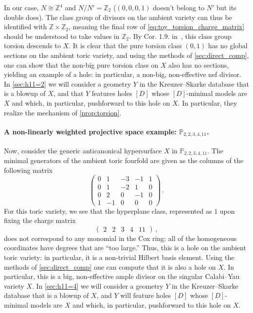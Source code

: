 \documentclass[11pt,dvipsnames]{article}
\theoremstyle{definition}
\begin{document}
In our case, $N \cong \mathbb{Z}^4$ and $N / N' = \mathbb{Z}_2$ ($(0,0,0,1)$ doesn't belong to $N'$ but its double does). The class group of divisors on the ambient variety can thus be identified with $\mathbb{Z} \times \mathbb{Z}_2$, meaning the final row of \cref{eq:toy_torsion_charge_matrix} should be understood to take values in $\mathbb{Z}_2$. By Cor. 1.9. in~\cite{Batyrev:2005jc}, this class group torsion descends to $X$. It is clear that the pure torsion class $(0,1)$ has no global sections on the ambient toric variety, and using the methods of \cref{sec:direct_comp}, one can show that the non-big pure torsion class on $X$ also has no sections, yielding an example of a hole: in particular, a non-big, non-effective nef divisor. In \cref{sec:h11=2} we will consider a geometry $Y$ in the Kreuzer--Skarke database that is a blowup of $X$, and that $Y$ features holes $[D]$ whose $[D]$-minimal models are $X$ and which, in particular, pushforward to this hole on $X$. In particular, they realize the mechanism of \cref{prop:torsion}.

\paragraph{A non-linearly weighted projective space example: $\mathbb{P}_{2,2,3,4,11}$.} Now, consider the generic anticanonical hypersurface $X$ in $\mathbb{P}_{2,2,3,4,11}$. The minimal generators of the ambient toric fourfold are given as the columns of the following matrix
\begin{equation}
    \begin{pmatrix}
        0 & 1 & -3 & -1 & 1 \\
        0 & 1 & -2 & 1 & 0\\
        0 & 2 & 0 & -1 & 0 \\
        1 & -1 & 0 & 0 & 0
    \end{pmatrix}\,.
\end{equation}
For this toric variety, we see that the hyperplane class, represented as $1$ upon fixing the charge matrix
\begin{equation}
    \begin{pmatrix}
        2 & 2 & 3 & 4 & 11
    \end{pmatrix}\,,
\end{equation}
does not correspond to any monomial in the Cox ring: all of the homogeneous coordinates have degrees that are ``too large.'' Thus, this is a hole on the ambient toric variety: in particular, it is a non-trivial Hilbert basis element. Using the methods of \cref{sec:direct_comp} one can compute that it is also a hole on $X$. In particular, this is a big, non-effective ample divisor on the singular Calabi--Yau variety $X$. 
In \cref{sec:h11=4} we will consider a geometry $Y$ in the Kreuzer--Skarke database that is a blowup of $X$, and $Y$ will feature holes $[D]$ whose $[D]$-minimal models are $X$ and which, in particular, pushforward to this hole on $X$.
\end{document}
